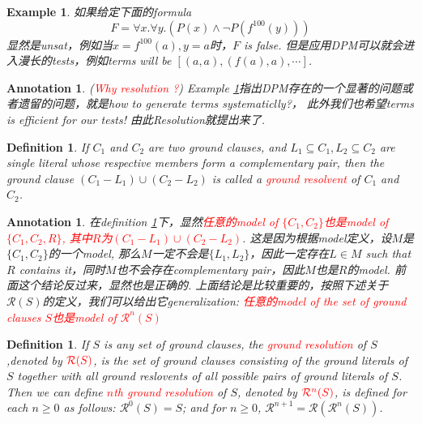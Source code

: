 \documentclass{article}
\theoremstyle{plain}
\newtheorem{example}[theorem]{Example}
\newtheorem{definition}[theorem]{Definition}
\newtheorem{annotation}[theorem]{Annotation}
\theoremstyle{nonumberplain}
\newcommand{\redt}[1]{\textcolor{red}{#1}}
\begin{document}
\begin{example}\label{DPM-shortage}
\rm 如果给定下面的formula
\[
	F = \forall x. \forall y. (P(x) \wedge \neg P(f^{100}(y)))
\]
显然是unsat，例如当$x = f^{100}(a), y = a$时，$F$ is false. 但是应用DPM可以就会进入漫长的tests，例如terms will be $[(a,a), (f(a), a), \cdots]$. 
\end{example}

\begin{annotation}
\rm (\redt{Why resolution ?}) Example \ref{DPM-shortage}指出DPM存在的一个显著的问题或者遗留的问题，就是how to generate terms systematiclly?， 此外我们也希望terms is efficient for our tests! 由此Resolution就提出来了.  
\end{annotation}

\begin{definition}\label{ground-resolvent}
\rm If $C_1$ and $C_2$ are two ground clauses, and $L_1 \subseteq C_1, L_2 \subseteq C_2$ are single literal whose respective members form a complementary pair, then the ground clause $(C_1 - L_1) \cup (C_2 - L_2)$ is called a \redt{ground resolvent} of $C_1$ and $C_2$.
\end{definition}

\begin{annotation}\label{sat-without-lost-under-res}
\rm 在definition \ref{ground-resolvent}下，显然\redt{任意的model of $\{C_1  ,C_2\}$也是model of $\{C_1 ,C_2, R\}$, 其中$R$为$(C_1 - L_1) \cup (C_2 - L_2)$}. 这是因为根据model定义，设$M$是$\{C_1,C_2\}$的一个model, 那么$M$一定不会是$\{L_1,L_2\}$，因此一定存在$L \in M$ such that $R$ contains it，同时$M$也不会存在complementary pair，因此$M$也是$R$的model. 前面这个结论反过来，显然也是正确的. 上面结论是比较重要的，按照下述关于$\mathcal{R}(S)$的定义，我们可以给出它generalization: \redt{任意的model of the set of ground clauses $S$也是model of $\mathcal{R}^n(S)$}
\end{annotation}

\begin{definition}
\rm If $S$ is any set of ground clauses, the \redt{ground resolution} of $S$ ,denoted by $\redt{\mathcal{R}(S)}$, is the set of ground clauses consisting of the ground literals of $S$ together with all ground reslovents of all possible pairs of ground literals of $S$.  Then we can define \redt{$n$th ground resolution} of $S$, denoted by $\redt{\mathcal{R}^n(S)}$, is defined for each $n \geq 0$ as follows: $\mathcal{R}^0(S) = S$; and for $n \geq 0$,  $\mathcal{R}^{n+1} = \mathcal{R}(\mathcal{R}^n(S))$.
\end{definition}
\end{document}
